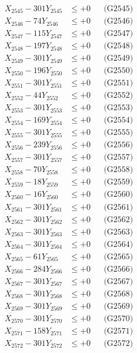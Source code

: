 \documentclass[a4paper,10pt]{article}
\begin{document}
{\begin{align}
X_{2545} - 301Y_{2545} &\leq +0 && \text{(G2545)} \\
X_{2546} - 74Y_{2546} &\leq +0 && \text{(G2546)} \\
X_{2547} - 115Y_{2547} &\leq +0 && \text{(G2547)} \\
X_{2548} - 197Y_{2548} &\leq +0 && \text{(G2548)} \\
X_{2549} - 301Y_{2549} &\leq +0 && \text{(G2549)} \\
X_{2550} - 196Y_{2550} &\leq +0 && \text{(G2550)} \\
\allowbreak
X_{2551} - 301Y_{2551} &\leq +0 && \text{(G2551)} \\
X_{2552} - 44Y_{2552} &\leq +0 && \text{(G2552)} \\
X_{2553} - 301Y_{2553} &\leq +0 && \text{(G2553)} \\
X_{2554} - 169Y_{2554} &\leq +0 && \text{(G2554)} \\
X_{2555} - 301Y_{2555} &\leq +0 && \text{(G2555)} \\
X_{2556} - 239Y_{2556} &\leq +0 && \text{(G2556)} \\
X_{2557} - 301Y_{2557} &\leq +0 && \text{(G2557)} \\
X_{2558} - 70Y_{2558} &\leq +0 && \text{(G2558)} \\
X_{2559} - 18Y_{2559} &\leq +0 && \text{(G2559)} \\
X_{2560} - 16Y_{2560} &\leq +0 && \text{(G2560)} \\
\allowbreak
X_{2561} - 301Y_{2561} &\leq +0 && \text{(G2561)} \\
X_{2562} - 301Y_{2562} &\leq +0 && \text{(G2562)} \\
X_{2563} - 301Y_{2563} &\leq +0 && \text{(G2563)} \\
X_{2564} - 301Y_{2564} &\leq +0 && \text{(G2564)} \\
X_{2565} - 61Y_{2565} &\leq +0 && \text{(G2565)} \\
X_{2566} - 284Y_{2566} &\leq +0 && \text{(G2566)} \\
X_{2567} - 301Y_{2567} &\leq +0 && \text{(G2567)} \\
X_{2568} - 301Y_{2568} &\leq +0 && \text{(G2568)} \\
X_{2569} - 301Y_{2569} &\leq +0 && \text{(G2569)} \\
X_{2570} - 301Y_{2570} &\leq +0 && \text{(G2570)} \\
\allowbreak
X_{2571} - 158Y_{2571} &\leq +0 && \text{(G2571)} \\
X_{2572} - 301Y_{2572} &\leq +0 && \text{(G2572)} \\

\end{align}}
\end{document}
